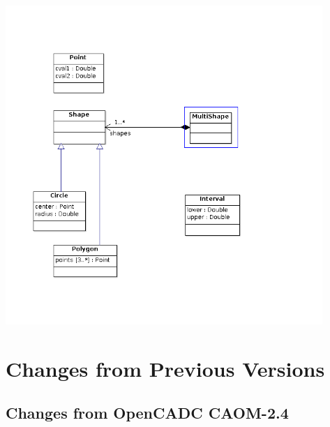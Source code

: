 \documentclass[11pt,a4paper]{ivoa}
\begin{document}
\begin{center}
\centering
\includegraphics[width=0.9\textwidth]{src/uml/DataTypes.png}
\label{fig:datatypes}
\end{center}



\appendix
\section{Changes from Previous Versions}

\subsection{Changes from OpenCADC CAOM-2.4}
\end{document}
